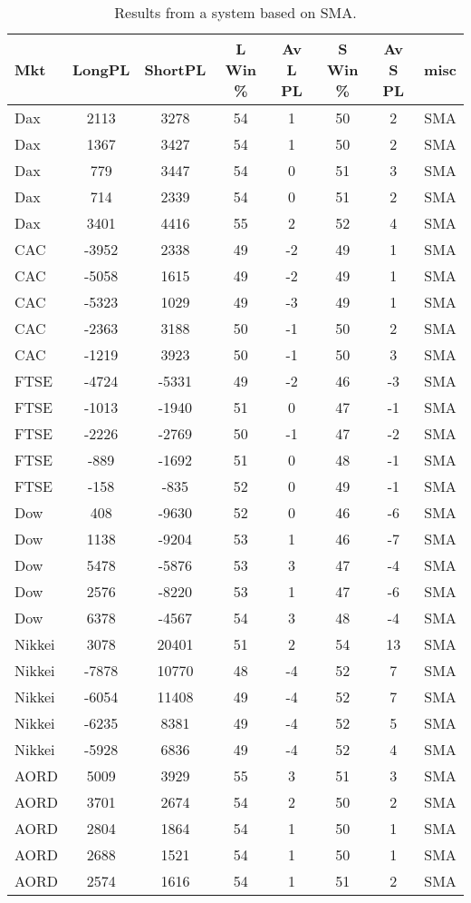 \begin{table}[ht]
\centering
\caption[Results from a system based on SMA]{Results from a system based on SMA.} 
\label{tab:sma_results}
\begin{tabular}{lccccccc}
  \toprule Mkt & LongPL & ShortPL & L Win \% & Av L PL & S Win \% & Av S PL & misc \\ 
  \midrule Dax & 2113 & 3278 & 54 & 1 & 50 & 2 & SMA \\ 
  Dax & 1367 & 3427 & 54 & 1 & 50 & 2 & SMA \\ 
  Dax & 779 & 3447 & 54 & 0 & 51 & 3 & SMA \\ 
  Dax & 714 & 2339 & 54 & 0 & 51 & 2 & SMA \\ 
  Dax & 3401 & 4416 & 55 & 2 & 52 & 4 & SMA \\ 
  CAC & -3952 & 2338 & 49 & -2 & 49 & 1 & SMA \\ 
  CAC & -5058 & 1615 & 49 & -2 & 49 & 1 & SMA \\ 
  CAC & -5323 & 1029 & 49 & -3 & 49 & 1 & SMA \\ 
  CAC & -2363 & 3188 & 50 & -1 & 50 & 2 & SMA \\ 
  CAC & -1219 & 3923 & 50 & -1 & 50 & 3 & SMA \\ 
  FTSE & -4724 & -5331 & 49 & -2 & 46 & -3 & SMA \\ 
  FTSE & -1013 & -1940 & 51 & 0 & 47 & -1 & SMA \\ 
  FTSE & -2226 & -2769 & 50 & -1 & 47 & -2 & SMA \\ 
  FTSE & -889 & -1692 & 51 & 0 & 48 & -1 & SMA \\ 
  FTSE & -158 & -835 & 52 & 0 & 49 & -1 & SMA \\ 
  Dow & 408 & -9630 & 52 & 0 & 46 & -6 & SMA \\ 
  Dow & 1138 & -9204 & 53 & 1 & 46 & -7 & SMA \\ 
  Dow & 5478 & -5876 & 53 & 3 & 47 & -4 & SMA \\ 
  Dow & 2576 & -8220 & 53 & 1 & 47 & -6 & SMA \\ 
  Dow & 6378 & -4567 & 54 & 3 & 48 & -4 & SMA \\ 
  Nikkei & 3078 & 20401 & 51 & 2 & 54 & 13 & SMA \\ 
  Nikkei & -7878 & 10770 & 48 & -4 & 52 & 7 & SMA \\ 
  Nikkei & -6054 & 11408 & 49 & -4 & 52 & 7 & SMA \\ 
  Nikkei & -6235 & 8381 & 49 & -4 & 52 & 5 & SMA \\ 
  Nikkei & -5928 & 6836 & 49 & -4 & 52 & 4 & SMA \\ 
  AORD & 5009 & 3929 & 55 & 3 & 51 & 3 & SMA \\ 
  AORD & 3701 & 2674 & 54 & 2 & 50 & 2 & SMA \\ 
  AORD & 2804 & 1864 & 54 & 1 & 50 & 1 & SMA \\ 
  AORD & 2688 & 1521 & 54 & 1 & 50 & 1 & SMA \\ 
  AORD & 2574 & 1616 & 54 & 1 & 51 & 2 & SMA \\ 
   \bottomrule \end{tabular}
\end{table}
